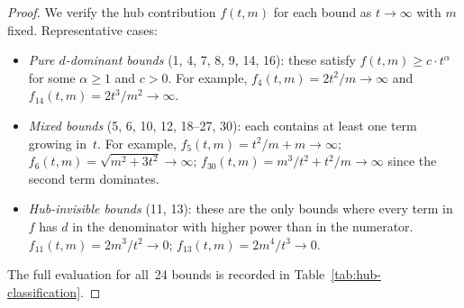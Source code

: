 \documentclass[preprint,12pt]{elsarticle}
\theoremstyle{definition}
\theoremstyle{remark}
\begin{document}
\begin{proof}
  We verify the hub contribution $f(t,m)$ for each bound as $t \to \infty$
  with $m$ fixed.  Representative cases:
  \begin{itemize}
    \item \emph{Pure $d$-dominant bounds} (1, 4, 7, 8, 9, 14, 16):
      these satisfy $f(t,m) \geq c \cdot t^{\alpha}$ for some
      $\alpha \geq 1$ and $c > 0$.
      For example, $f_4(t,m) = 2t^2/m \to \infty$
      and $f_{14}(t,m) = 2t^3/m^2 \to \infty$.
    \item \emph{Mixed bounds} (5, 6, 10, 12, 18--27, 30): each contains
      at least one term growing in~$t$.
      For example, $f_5(t,m) = t^2/m + m \to \infty$;
      $f_6(t,m) = \sqrt{m^2 + 3t^2} \to \infty$;
      $f_{30}(t,m) = m^3/t^2 + t^2/m \to \infty$
      since the second term dominates.
    \item \emph{Hub-invisible bounds} (11, 13): these are the only bounds
      where every term in~$f$ has $d$ in the denominator with higher power
      than in the numerator.
      $f_{11}(t,m) = 2m^3/t^2 \to 0$;
      $f_{13}(t,m) = 2m^4/t^3 \to 0$.
  \end{itemize}
  The full evaluation for all~24 bounds is recorded in
  Table~\ref{tab:hub-classification}.
\end{proof}
\end{document}

